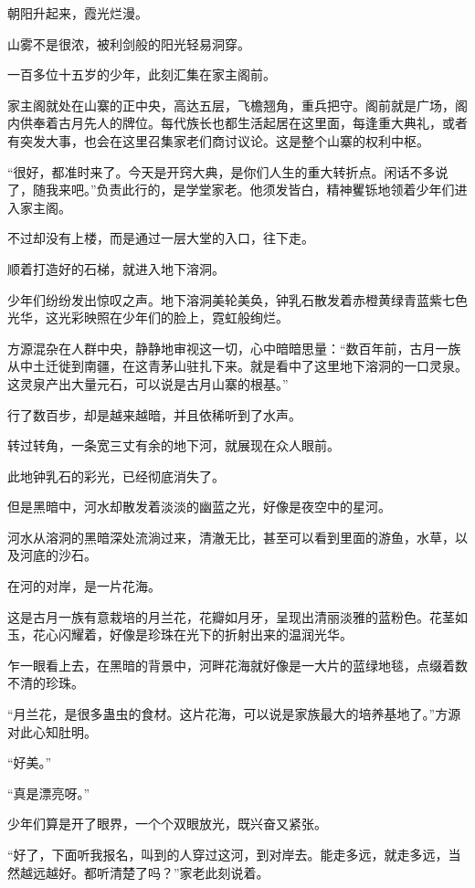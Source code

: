 
\begin{this_body}

朝阳升起来，霞光烂漫。

山雾不是很浓，被利剑般的阳光轻易洞穿。

一百多位十五岁的少年，此刻汇集在家主阁前。

家主阁就处在山寨的正中央，高达五层，飞檐翘角，重兵把守。阁前就是广场，阁内供奉着古月先人的牌位。每代族长也都生活起居在这里面，每逢重大典礼，或者有突发大事，也会在这里召集家老们商讨议论。这是整个山寨的权利中枢。

“很好，都准时来了。今天是开窍大典，是你们人生的重大转折点。闲话不多说了，随我来吧。”负责此行的，是学堂家老。他须发皆白，精神矍铄地领着少年们进入家主阁。

不过却没有上楼，而是通过一层大堂的入口，往下走。

顺着打造好的石梯，就进入地下溶洞。

少年们纷纷发出惊叹之声。地下溶洞美轮美奂，钟乳石散发着赤橙黄绿青蓝紫七色光华，这光彩映照在少年们的脸上，霓虹般绚烂。

方源混杂在人群中央，静静地审视这一切，心中暗暗思量：“数百年前，古月一族从中土迁徙到南疆，在这青茅山驻扎下来。就是看中了这里地下溶洞的一口灵泉。这灵泉产出大量元石，可以说是古月山寨的根基。”

行了数百步，却是越来越暗，并且依稀听到了水声。

转过转角，一条宽三丈有余的地下河，就展现在众人眼前。

此地钟乳石的彩光，已经彻底消失了。

但是黑暗中，河水却散发着淡淡的幽蓝之光，好像是夜空中的星河。

河水从溶洞的黑暗深处流淌过来，清澈无比，甚至可以看到里面的游鱼，水草，以及河底的沙石。

在河的对岸，是一片花海。

这是古月一族有意栽培的月兰花，花瓣如月牙，呈现出清丽淡雅的蓝粉色。花茎如玉，花心闪耀着，好像是珍珠在光下的折射出来的温润光华。

乍一眼看上去，在黑暗的背景中，河畔花海就好像是一大片的蓝绿地毯，点缀着数不清的珍珠。

“月兰花，是很多蛊虫的食材。这片花海，可以说是家族最大的培养基地了。”方源对此心知肚明。

“好美。”

“真是漂亮呀。”

少年们算是开了眼界，一个个双眼放光，既兴奋又紧张。

“好了，下面听我报名，叫到的人穿过这河，到对岸去。能走多远，就走多远，当然越远越好。都听清楚了吗？”家老此刻说着。


\end{this_body}
